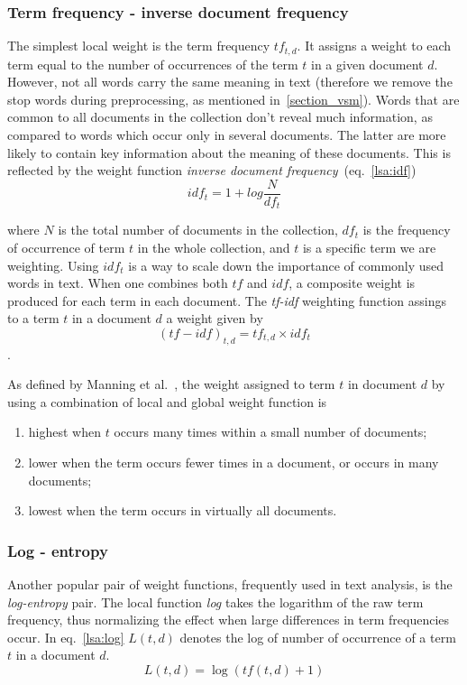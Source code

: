 \subsubsection{Term frequency - inverse document frequency}
\label{lsa:tf-idf-section}
The simplest local weight is the term frequency $tf_{t,d}$. It assigns a weight to each term equal to the number of occurrences of the term $t$ in a given document $d$. However, not all words carry the same meaning in text (therefore we remove the stop words during preprocessing, as mentioned in~\ref{section_vsm}). Words that are common to all documents in the collection don't reveal much information, as compared to words which occur only in several documents. The latter are more likely to contain key information about the meaning of these documents.  This is reflected by the weight function \textit{inverse document frequency}~(eq.~\ref{lsa:idf})
\begin{equation}
\label{lsa:idf}
idf_{t}=1 + log\frac{N}{df_{t}}
\end{equation}

where $N$ is the total number of documents in the collection, $df_{t}$ is the frequency of occurrence of term $t$ in the whole collection, and $t$ is a specific term we are weighting. Using $idf_{t}$ is a way to scale down the importance of commonly used words in text. When one combines both $tf$ and $idf$, a composite weight is produced for each term in each document. The \textit{tf-idf} weighting function assings to a term $t$ in a document $d$ a weight given by 
\begin{equation}
\label{lsa:tf_idf}
(tf-idf)_{t,d}=tf_{t,d} \times idf_{t}
\end{equation}. 

As defined by Manning et al.~\cite{IRbook2008}, the weight assigned to term $t$ in document $d$ by using a combination of local and global weight function is 
\begin{enumerate}
\item highest when $t$ occurs many times within a small number of documents;
\item lower when the term occurs fewer times in a document, or occurs in many documents;
\item lowest when the term occurs in virtually all documents.
\end{enumerate} 

\subsubsection{Log - entropy}
\label{lsa:log-entropy-section}
Another popular pair of weight functions, frequently used in text analysis, is the \textit{log-entropy} pair. The local function \textit{log} takes the logarithm of the raw term frequency, thus normalizing the effect when large differences in term frequencies occur. In eq.~\ref{lsa:log} $L(t,d)$ denotes the log of number of occurrence of a term $t$ in a document $d$. \\
\begin{equation}
L(t,d)=\log(tf(t,d)+1)
\label{lsa:log}
\end{equation}


